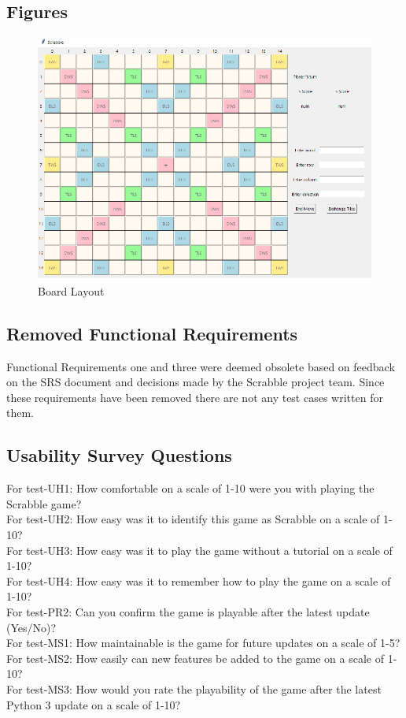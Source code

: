 \documentclass[12pt, titlepage]{article}
\begin{document}
\subsection{Figures}

\begin{figure}[H]
    \centering
    \includegraphics{TestPlan/Scrabble Board.png}
    \caption{Board Layout}
    \label{fig:my_label}
\end{figure}

\subsection{Removed Functional Requirements}
Functional Requirements one and three were deemed obsolete based on feedback on the SRS document and decisions made by the Scrabble project team. Since these requirements have been removed there are not any test cases written for them.\\
\subsection{Usability Survey Questions}
For test-UH1: How comfortable on a scale of 1-10 were you with playing the Scrabble game?\\
For test-UH2: How easy was it to identify this game as Scrabble on a scale of 1-10?\\
For test-UH3: How easy was it to play the game without a tutorial on a scale of 1-10?\\
For test-UH4: How easy was it to remember how to play the game on a scale of 1-10?\\
For test-PR2: Can you confirm the game is playable after the latest update (Yes/No)?\\
For test-MS1: How maintainable is the game for future updates on a scale of 1-5?\\
For test-MS2: How easily can new features be added to the game on a scale of 1-10?\\
For test-MS3: How would you rate the playability of the game after the latest Python 3 update on a scale of 1-10?\\
\end{document}
